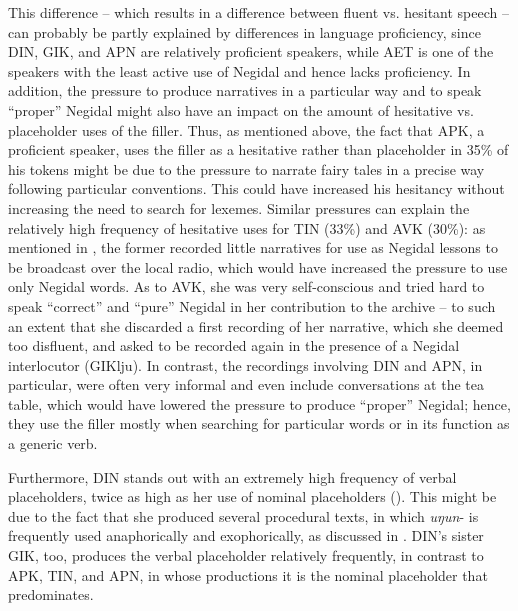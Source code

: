 \documentclass[output=paper]{langscibook}
\begin{document}
This difference – which results in a difference between fluent vs. hesitant speech – can probably be partly explained by differences in language proficiency, since DIN, GIK, and APN are relatively proficient speakers, while AET is one of the speakers with the least active use of Negidal and hence lacks proficiency. In addition, the pressure to produce narratives in a particular way and to speak “proper” Negidal might also have an impact on the amount of hesitative vs. placeholder uses of the filler. Thus, as mentioned above, the fact that APK, a proficient speaker, uses the filler as a hesitative rather than placeholder in 35\% of his tokens might be due to the pressure to narrate fairy tales in a precise way following particular conventions. This could have increased his hesitancy without increasing the need to search for lexemes. Similar pressures can explain the relatively high frequency of hesitative uses for TIN (33\%) and AVK (30\%): as mentioned in , the former recorded little narratives for use as Negidal lessons to be broadcast over the local radio, which would have increased the pressure to use only Negidal words. As to AVK, she was very self-conscious and tried hard to speak “correct” and “pure” Negidal in her contribution to the archive – to such an extent that she discarded a first recording of her narrative, which she deemed too disfluent, and asked to be recorded again in the presence of a Negidal interlocutor (GIKlju). In contrast, the recordings involving DIN and APN, in particular, were often very informal and even include conversations at the tea table, which would have lowered the pressure to produce “proper” Negidal; hence, they use the filler mostly when searching for particular words or in its function as a generic verb.

Furthermore, DIN stands out with an extremely high frequency of verbal placeholders, twice as high as her use of nominal placeholders (). This might be due to the fact that she produced several procedural texts, in which \textit{uŋun}- is frequently used anaphorically and exophorically, as discussed in .  DIN’s sister GIK, too, produces the verbal placeholder relatively frequently, in contrast to APK, TIN, and APN, in whose productions it is the nominal placeholder that predominates.
\end{document}
